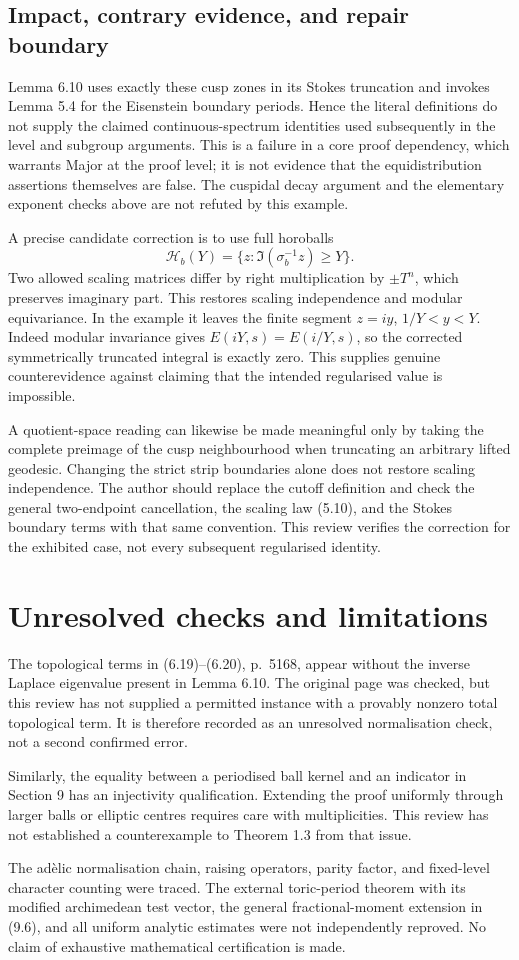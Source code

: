 \documentclass[10pt]{article}
\begin{document}
\subsection*{Impact, contrary evidence, and repair boundary}
Lemma 6.10 uses exactly these cusp zones in its Stokes truncation and invokes Lemma 5.4 for the Eisenstein boundary periods. Hence the literal definitions do not supply the claimed continuous-spectrum identities used subsequently in the level and subgroup arguments. This is a failure in a core proof dependency, which warrants Major at the proof level; it is not evidence that the equidistribution assertions themselves are false. The cuspidal decay argument and the elementary exponent checks above are not refuted by this example.\par
A precise candidate correction is to use full horoballs \[\mathcal H_b(Y)=
       \{z:\Im(\sigma_b^{-1}z)\ge Y\}.\] Two allowed scaling matrices differ by right multiplication by \(\pm T^n\), which preserves imaginary part. This restores scaling independence and modular equivariance. In the example it leaves the finite segment \(z=iy\), \(1/Y<y<Y\). Indeed modular invariance gives \(E(iY,s)=E(i/Y,s)\), so the corrected symmetrically truncated integral is exactly zero. This supplies genuine counterevidence against claiming that the intended regularised value is impossible.\par
A quotient-space reading can likewise be made meaningful only by taking the complete preimage of the cusp neighbourhood when truncating an arbitrary lifted geodesic. Changing the strict strip boundaries alone does not restore scaling independence. The author should replace the cutoff definition and check the general two-endpoint cancellation, the scaling law (5.10), and the Stokes boundary terms with that same convention. This review verifies the correction for the exhibited case, not every subsequent regularised identity.\par
\section*{Unresolved checks and limitations}
The topological terms in (6.19)–(6.20), p. 5168, appear without the inverse Laplace eigenvalue present in Lemma 6.10. The original page was checked, but this review has not supplied a permitted instance with a provably nonzero total topological term. It is therefore recorded as an unresolved normalisation check, not a second confirmed error.\par
Similarly, the equality between a periodised ball kernel and an indicator in Section 9 has an injectivity qualification. Extending the proof uniformly through larger balls or elliptic centres requires care with multiplicities. This review has not established a counterexample to Theorem 1.3 from that issue.\par
The adèlic normalisation chain, raising operators, parity factor, and fixed-level character counting were traced. The external toric-period theorem with its modified archimedean test vector, the general fractional-moment extension in (9.6), and all uniform analytic estimates were not independently reproved. No claim of exhaustive mathematical certification is made.\par
\end{document}
